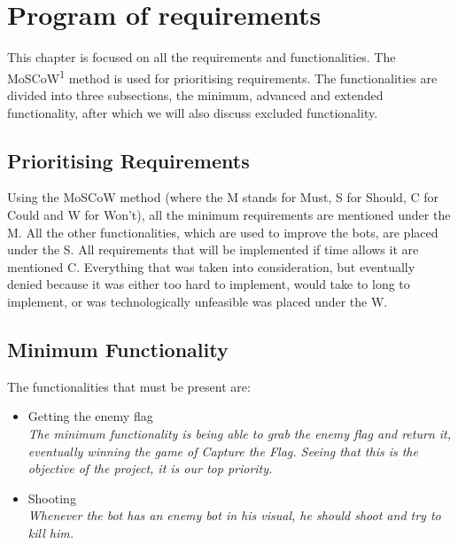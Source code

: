 \chapter{Program of requirements}
This chapter is focused on all the requirements and functionalities. The MoSCoW\textsuperscript{1} method is used for prioritising requirements. The functionalities are divided into three subsections, the minimum, advanced and extended functionality, after which we will also discuss excluded functionality.
\section{Prioritising Requirements}
Using the MoSCoW method (where the M stands for Must, S for Should, C for Could and W for Won't), all the minimum requirements are mentioned under the M. All the other functionalities, which are used to improve the bots, are placed under the S. All requirements that will be implemented if time allows it are mentioned C. Everything that was taken into consideration, but eventually denied because it was either too hard to implement, would take to long to implement, or was technologically unfeasible was placed under the W.\\


\section{Minimum Functionality}
The functionalities that must be present are:
\begin{itemize}
	\item Getting the enemy flag \\
		\textit{The minimum functionality is being able to grab the enemy flag and return it, eventually winning the game of Capture the Flag. Seeing that this is the objective of the project, it is our top priority.}
	\item Shooting \\
		\textit{Whenever the bot has an enemy bot in his visual, he should shoot and try to kill him.}
\end{itemize}

